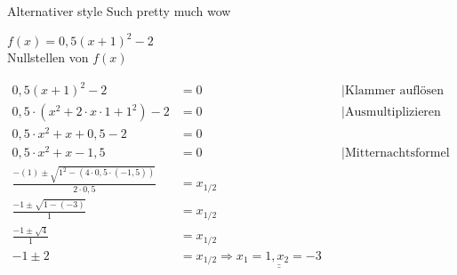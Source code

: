 \documentclass[ngerman]{Tuda_Hausuebung}
\begin{document}
\begin{task}[points=5,solution=true]{Alternativer style}
    Such pretty much wow
    \begin{subtask}[title={Ganzzahladdition auf $\mathbb{N}$},points=2]
        \gegeben $f(x)=0,5(x+1)^2-2$\\
        \zuberechnen Nullstellen von $f(x)$\\
        \begin{solution}
            \begin{align*}
                0,5(x+1)^2-2                                                    & =0                                                                                                 &  & \vert \text{Klammer auflösen}                        \\
                0,5\cdot(x^2+2\cdot x \cdot 1 + 1^2)-2                          & =0                                                                                                 &  & \vert \text{Ausmultiplizieren}                       \\
                0,5\cdot x^2+x +0,5-2                                           & =0                                                                                                                                                           \\
                0,5\cdot x^2+x -1,5                                             & =0                                                                                                 &  & \vert \text{Mitternachtsformel mit a=0,5;b=1;c=-1,5} \\
                \frac{-(1)\pm \sqrt{1^2-(4\cdot 0,5 \cdot (-1,5))}}{2\cdot 0,5} & =x_{1/2}                                                                                                                                                     \\
                \frac{-1\pm \sqrt{1-(-3)}}{1}                                   & =x_{1/2}                                                                                                                                                     \\
                \frac{-1\pm \sqrt{4}}{1}                                        & =x_{1/2}                                                                                                                                                     \\
                -1 \pm 2                                                        & =x_{1/2} \Rightarrow \underline{\underline{x_1                                       = 1, x_2=-3}}
            \end{align*}
        \end{solution}
    \end{subtask}
\end{task}
\end{document}
